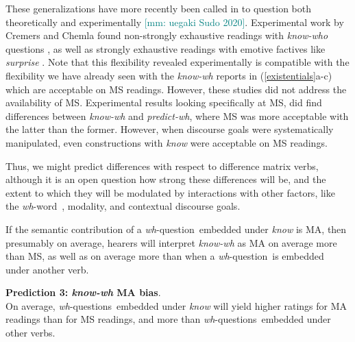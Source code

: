 \documentclass[12pt,letterpaper,table,svgnames,dvipsnames]{article}
\newcommand{\jd}[1]{\textcolor{Purple}{[jd: #1]}}
\newcommand{\mm}[1]{\textcolor{teal}{[mm: #1]}}
\newcommand{\whq}{\emph{wh}-question~}
\newcommand{\whqs}{\emph{wh}-questions~}
\newcommand{\whw}{\emph{wh}-word~}
\begin{document}

These generalizations have more recently been called in to question both theoretically and experimentally \cite{cremchem2016,cremchem2017,klineroth2011,theiler2014} \mm{uegaki Sudo 2020}. Experimental work by Cremers and Chemla found non-strongly exhaustive readings with \emph{know-who} questions \cite{cremchem2016}, as well as strongly exhaustive readings with emotive factives like \emph{surprise} \cite{cremchem2017}. Note that this flexibility revealed experimentally is compatible with the flexibility we have already seen with the \emph{know-wh} reports in (\ref{existentials}a-c) which are acceptable on MS readings. However, these studies did not address the availability of MS. Experimental results looking specifically at MS,  did find differences between \emph{know-wh} and \emph{predict-wh}, where MS was more acceptable with the latter than the former. However, when discourse goals were systematically manipulated, even constructions with \emph{know} were acceptable on MS readings. 

Thus, we might predict differences with respect to difference matrix verbs, although it is an open question how strong these differences will be, and the extent to which they will be modulated by interactions with other factors, like the \whw, modality, and contextual discourse goals.

If the semantic contribution of a \whq embedded under \emph{know} is MA, then presumably on average, hearers will interpret \emph{know-wh} as MA on average more than MS, as well as on average more than when a \whq is embedded under another verb.

\begin{tcolorbox}[colback=white]
\noindent \textbf{Prediction 3: \emph{know-wh} MA bias}.\\
On average, \whqs embedded under \emph{know} will yield higher ratings for MA readings than for MS readings, and more than \whqs embedded under other verbs. 
\end{tcolorbox}
\end{document}
